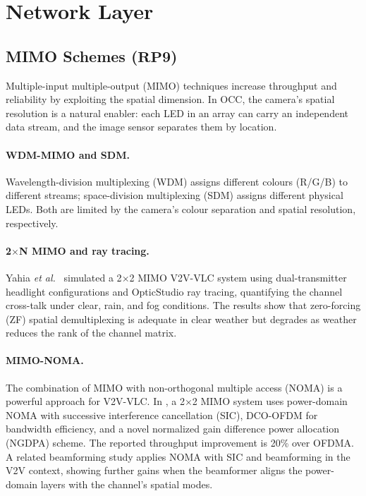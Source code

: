 \documentclass[10pt,a4paper]{article}
\newcommand{\rp}[1]{\textbf{RP#1}}
\begin{document}
\section{Network Layer}
\label{sec:network}

\subsection{MIMO Schemes ($\rp{9}$)}
\label{sec:rp9}

Multiple-input multiple-output (MIMO) techniques increase throughput and
reliability by exploiting the spatial dimension. In OCC, the camera's
spatial resolution is a natural enabler: each LED in an array can carry
an independent data stream, and the image sensor separates them by
location.

\paragraph{WDM-MIMO and SDM.}
Wavelength-division multiplexing (WDM) assigns different colours
(R/G/B) to different streams; space-division multiplexing (SDM) assigns
different physical LEDs. Both are limited by the camera's colour
separation and spatial resolution, respectively.

\paragraph{2$\times$N MIMO and ray tracing.}
Yahia \emph{et al.}~\cite{yahia2022mimo} simulated a 2$\times$2 MIMO
V2V-VLC system using dual-transmitter headlight configurations and
OpticStudio ray tracing, quantifying the channel cross-talk under
clear, rain, and fog conditions. The results show that zero-forcing (ZF)
spatial demultiplexing is adequate in clear weather but degrades as
weather reduces the rank of the channel matrix.

\paragraph{MIMO-NOMA.}
The combination of MIMO with non-orthogonal multiple access (NOMA) is a
powerful approach for V2V-VLC. In \cite{mimonoma2025v2v}, a 2$\times$2
MIMO system uses power-domain NOMA with successive interference
cancellation (SIC), DCO-OFDM for bandwidth efficiency, and a novel
normalized gain difference power allocation (NGDPA) scheme. The reported
throughput improvement is 20\% over OFDMA. A related beamforming study
\cite{vlcNoma2023beamforming} applies NOMA with SIC and beamforming in
the V2V context, showing further gains when the beamformer aligns the
power-domain layers with the channel's spatial modes.
\end{document}

